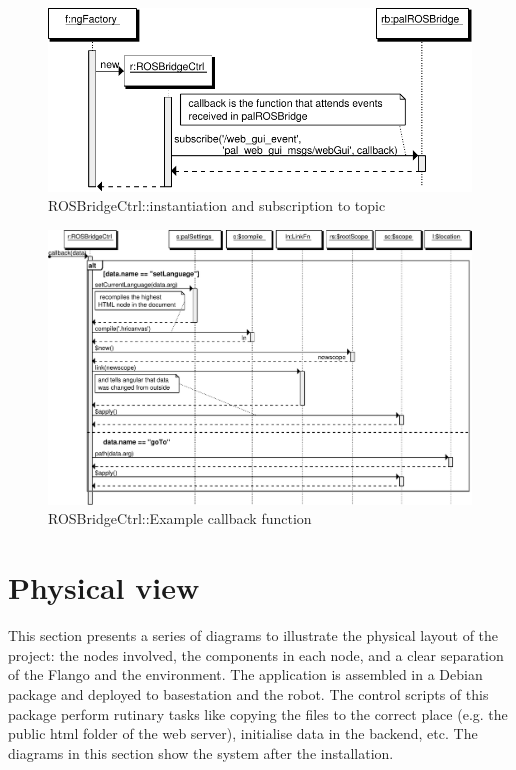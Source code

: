 \begin{figure}[htb]
    \centering
    \includegraphics{figures/design/seqdia/ROSBridgeCtrl-creation.pdf}
    \caption{ROSBridgeCtrl::instantiation and subscription to topic}
    \label{fig:design-seqdia-ROSBridgeCtrl-creation}
\end{figure}

\begin{figure}
    \centering
    \includegraphics{figures/design/seqdia/ROSBridgeCtrl-callback.pdf}
    \caption{ROSBridgeCtrl::Example callback function}
    \label{fig:design-seqdia-ROSBridgeCtrl-callback}
\end{figure}

\FloatBarrier

\section{Physical view}
This section presents a series of diagrams to illustrate the physical layout of the project: the nodes involved, the components in each node, and a clear separation of the Flango \cm and the environment.
The application is assembled in a Debian package and deployed to basestation and the robot.
The control scripts of this package perform rutinary tasks like copying the files to the correct place (e.g. the public html folder of the web server), initialise data in the backend, etc.
The diagrams in this section show the system after the installation.

